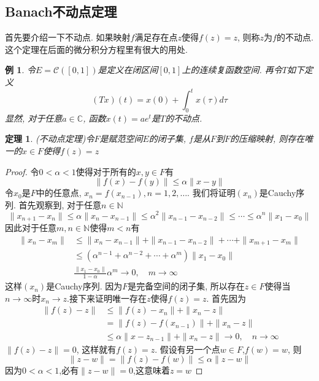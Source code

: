 \documentclass[a4paper,11pt]{book}
\newtheorem{theorem}{\hspace{2em}定理}[section]
\newtheorem{proof}{证明}[section]
\newtheorem{example}{例}[section]
\begin{document}
\subsection*{Banach不动点定理}
首先要介绍一下不动点. 如果映射$f$满足存在点$z$使得$f(z)=z$, 则称$z$为$f$的不动点. 这个定理在后面的微分积分方程里有很大的用处.
\begin{example}
  令$E=\mathcal{C}([0,1])$是定义在闭区间$[0,1]$上的连续复函数空间. 再令$T$如下定义
  \begin{equation*}
    (Tx)(t)=x(0)+\int_{0}^{t}x(\tau)d\tau
  \end{equation*}
  显然, 对于任意$a\in \mathbb{C}$, 函数$x(t)=ae^t$是$T$的不动点.
\end{example}
\begin{theorem}
  (不动点定理)令$F$是赋范空间$E$的闭子集, $f$是从$F$到$F$的压缩映射, 则存在唯一的$x\in F$使得$f(z)=z$
\end{theorem}
\begin{proof}
  令$0<\alpha<1$使得对于所有的$x,y\in F$有
  \begin{equation*}
    \|f(x)-f(y)\|\leq\alpha\|x-y\|
  \end{equation*}
  令$x_0$是$F$中的任意点, $x_n=f(x_{n-1}),n=1,2,\dots$. 我们将证明$(x_n)$是Cauchy序列. 首先观察到, 对于任意$n\in \mathbb{N}$
  \begin{equation*}
    \|x_{n+1}-x_n\|\leq\alpha\|x_n-x_{n-1}\|\leq\alpha^2\|x_{n-1}-x_{n-2}\|\leq\cdots\leq\alpha^n\|x_1-x_0\|
  \end{equation*}
  因此对于任意$m,n\in\mathbb{N}$使得$m<n$有
  \begin{equation*}
  \begin{split}
     \|x_n-x_m\| & \leq\|x_n-x_{n-1}\|+\|x_{n-1}-x_{n-2}\|+\cdots+\|x_{m+1}-x_{m}\| \\
       & \leq(\alpha^{n-1}+\alpha^{n-2}+\cdots+\alpha^m)\|x_1-x_0\| \\
       & \frac{\|x_1-x_0\|}{1-\alpha}\alpha^m\to 0,\quad m\to\infty
  \end{split}
  \end{equation*}
  这样$(x_n)$是Cauchy序列. 因为$F$是完备空间的闭子集, 所以存在$z\in F$使得当$n\to\infty$时$x_n\to z$.接下来证明唯一存在$z$使得$f(z)=z$.
  首先因为
  \begin{equation*}\
  \begin{split}
     \|f(z)-z\|&\leq\|f(z)-x_n\|+\|x_n-z\| \\
       &=\|f(z)-f(x_{n-1})\|+\|x_n-z\| \\
       &\leq\alpha\|x-z_{n-1}\|+\|x_n-z\|\to 0,\quad n\to\infty
  \end{split}
  \end{equation*}
  $\|f(z)-z\|=0$, 这样就有$f(z)=z$. 假设有另一个点$w\in F$,$f(w)=w$, 则
  \begin{equation*}
    \|z-w\|=\|f(z)-f(w)\|\leq\alpha\|z-w\|
  \end{equation*}
  因为$0<\alpha<1$,必有$\|z-w\|=0$,这意味着$z=w$
\end{proof}
\end{document}
